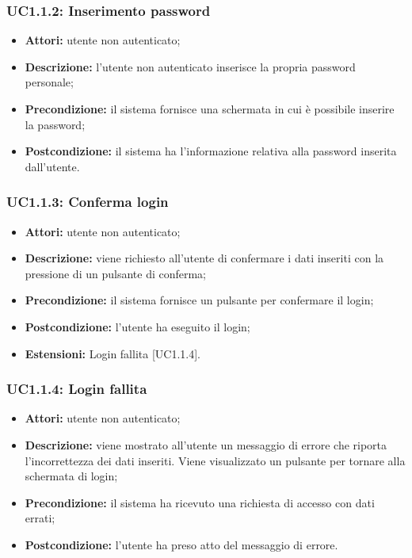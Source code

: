 \subsubsection{UC1.1.2: Inserimento password}

\begin{itemize}
    \item \textbf{Attori:} utente non autenticato;
    \item \textbf{Descrizione:} l'utente non autenticato inserisce la propria password personale;
    \item \textbf{Precondizione:} il sistema fornisce una schermata in cui è possibile inserire la password;
    \item \textbf{Postcondizione:} il sistema ha l'informazione relativa alla password inserita dall'utente.
\end{itemize}

\subsubsection{UC1.1.3: Conferma login}

\begin{itemize}
    \item \textbf{Attori:} utente non autenticato;
    \item \textbf{Descrizione:} viene richiesto all'utente di confermare i dati inseriti con la pressione di un pulsante di conferma;
    \item \textbf{Precondizione:} il sistema fornisce un pulsante per confermare il login;
    \item \textbf{Postcondizione:} l'utente ha eseguito il login;
    \item \textbf{Estensioni:} Login fallita [UC1.1.4].
\end{itemize}

\subsubsection{UC1.1.4: Login fallita}

\begin{itemize}
    \item \textbf{Attori:} utente non autenticato;
    \item \textbf{Descrizione:} viene mostrato all'utente un messaggio di errore che riporta l'incorrettezza dei dati inseriti. Viene visualizzato un pulsante per tornare alla schermata di login;
    \item \textbf{Precondizione:} il sistema ha ricevuto una richiesta di accesso con dati errati;
    \item \textbf{Postcondizione:} l'utente ha preso atto del messaggio di errore.
\end{itemize}

